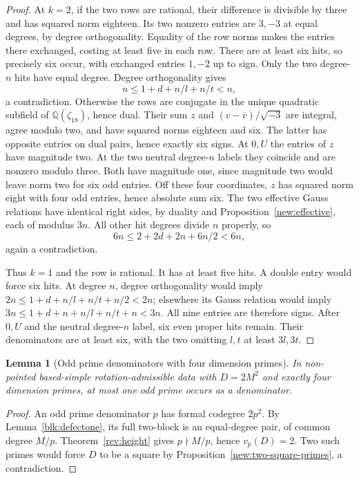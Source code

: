 \documentclass[11pt]{amsart}
\numberwithin{equation}{section}
\newtheorem{lemma}[theorem]{Lemma}
\theoremstyle{definition}
\theoremstyle{plain}
\begin{document}
\begin{proof}
At $k=2$, if the two rows are rational, their difference is divisible
by three and has squared norm eighteen.  Its two nonzero entries are
$3,-3$ at equal degrees, by degree orthogonality.  Equality of the
row norms makes the entries there exchanged, costing at least five
in each row.  There are at least six hits, so precisely six occur,
with exchanged entries $1,-2$ up to sign.  Only the two degree-$n$
hits have equal degree.  Degree orthogonality gives
\[
 n\le1+d+n/l+n/t<n,
\]
a contradiction.  Otherwise the rows are conjugate in the unique
quadratic subfield of $\mathbb Q(\zeta_{18})$, hence dual.  Their
sum $z$ and $(v-\overline v)/\sqrt{-3}$ are integral, agree modulo
two, and have squared norms eighteen and six.  The latter has
opposite entries on dual pairs, hence exactly six signs.  At $0,U$
the entries of $z$ have magnitude two.  At the two neutral degree-$n$
labels they coincide and are nonzero modulo three.  Both have
magnitude one, since magnitude two would leave norm two for six
odd entries.  Off these four coordinates, $z$ has squared norm eight
with four odd entries, hence absolute sum six.  The two effective
Gauss relations have identical right sides, by duality and
Proposition~\ref{new:effective}, each of modulus $3n$.  All other
hit degrees divide $n$ properly, so
\[
 6n\le2+2d+2n+6n/2<6n,
\]
again a contradiction.

Thus $k=1$ and the row is rational.  It has at least five hits.
A double entry would force six hits.  At degree $n$, degree
orthogonality would imply
$2n\le1+d+n/l+n/t+n/2<2n$; elsewhere its Gauss relation would
imply $3n\le1+d+n+n/l+n/t+n<3n$.
All nine entries are therefore signs.  After $0,U$ and the neutral
degree-$n$ label, six even proper hits remain.  Their denominators
are at least six, with the two omitting $l,t$ at least $3l,3t$.
\end{proof}

\begin{lemma}[Odd prime denominators with four dimension primes]
\label{ext:eight-common-fiber}
In non-pointed based-simple rotation-admissible data with $D=2M^2$
and exactly four dimension primes, at most one odd prime occurs
as a denominator.
\end{lemma}
\begin{proof}
An odd prime denominator $p$ has formal codegree $2p^2$.
By Lemma~\ref{blk:defectone}, its full two-block is an equal-degree
pair, of common degree $M/p$. Theorem~\ref{rev:height} gives
$p\nmid M/p$, hence $v_p(D)=2$. Two such primes would force $D$
to be a square by Proposition~\ref{new:two-square-primes},
a contradiction.
\end{proof}
\end{document}
